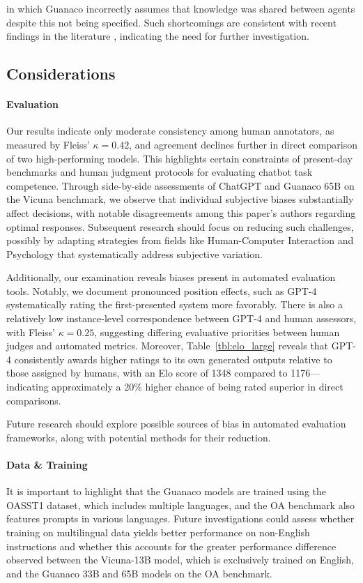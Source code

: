 in which {Guanaco} incorrectly assumes that knowledge was shared between agents despite this not being specified. Such shortcomings are consistent with recent findings in the literature \cite{sap2022neural}, indicating the need for further investigation.

\subsection{Considerations}
\label{ssec:considerations}

\paragraph{Evaluation}

Our results indicate only moderate consistency among human annotators, as measured by Fleiss' $\kappa=0.42$, and agreement declines further in direct comparison of two high-performing models. This highlights certain constraints of present-day benchmarks and human judgment protocols for evaluating chatbot task competence. Through side-by-side assessments of ChatGPT and {Guanaco} 65B on the Vicuna benchmark, we observe that individual subjective biases substantially affect decisions, with notable disagreements among this paper's authors regarding optimal responses. Subsequent research should focus on reducing such challenges, possibly by adapting strategies from fields like Human-Computer Interaction and Psychology that systematically address subjective variation.

Additionally, our examination reveals biases present in automated evaluation tools. Notably, we document pronounced position effects, such as GPT-4 systematically rating the first-presented system more favorably. There is also a relatively low instance-level correspondence between GPT-4 and human assessors, with Fleiss' $\kappa=0.25$, suggesting differing evaluative priorities between human judges and automated metrics. Moreover, Table~\ref{tbl:elo_large} reveals that GPT-4 consistently awards higher ratings to its own generated outputs relative to those assigned by humans, with an Elo score of 1348 compared to 1176—indicating approximately a 20\% higher chance of being rated superior in direct comparisons.

Future research should explore possible sources of bias in automated evaluation frameworks, along with potential methods for their reduction.

\paragraph{Data \& Training} It is important to highlight that the {Guanaco} models are trained using the OASST1 dataset, which includes multiple languages, and the OA benchmark also features prompts in various languages. Future investigations could assess whether training on multilingual data yields better performance on non-English instructions and whether this accounts for the greater performance difference observed between the Vicuna-13B model, which is exclusively trained on English, and the {Guanaco} 33B and 65B models on the OA benchmark.

